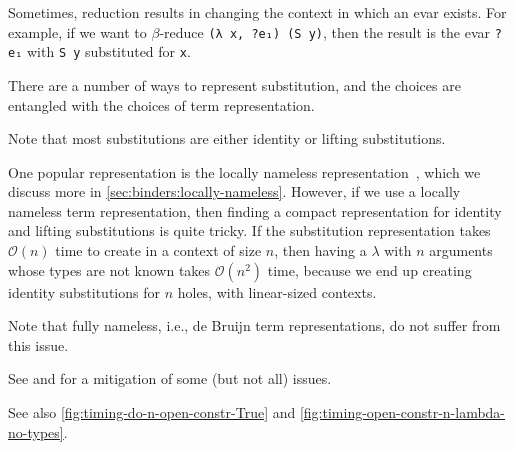 Sometimes, reduction results in changing the context in which an evar exists.
For example, if we want to $\beta$-reduce \texttt{(λ x, ?e₁) (S y)}, then the result is the evar \texttt{?e₁} with \texttt{S y} substituted for \texttt{x}.

There are a number of ways to represent substitution, and the choices are entangled with the choices of term representation.

Note that most substitutions are either identity or lifting substitutions.

One popular representation is the locally nameless representation~\cite{Locally2012Chargueraud,locally2007Leroy}, which we discuss more in \autoref{sec:binders:locally-nameless}.
However, if we use a locally nameless term representation, then finding a compact representation for identity and lifting substitutions is quite tricky.
If the substitution representation takes $\mathcal O(n)$ time to create in a context of size $n$, then having a $\lambda$ with $n$ arguments whose types are not known takes $\mathcal O(n^2)$ time, because we end up creating identity substitutions for $n$ holes, with linear-sized contexts.

Note that fully nameless, i.e., de Bruijn term representations, do not suffer from this issue.

See  and  for a mitigation of some (but not all) issues.

See also \autoref{fig:timing-do-n-open-constr-True} and \autoref{fig:timing-open-constr-n-lambda-no-types}.

